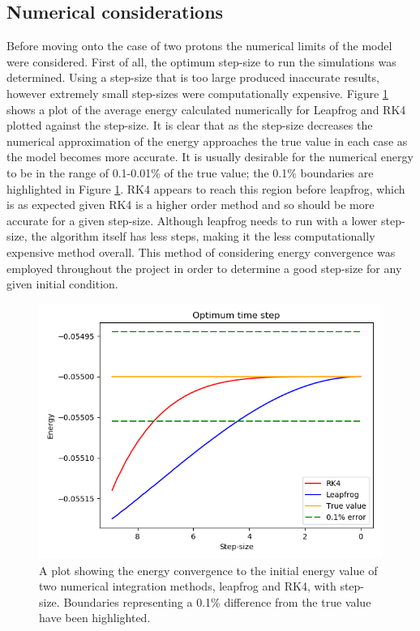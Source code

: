 \documentclass[12pt]{article} %
\numberwithin{equation}{subsection} %
\begin{document}
\subsection{Numerical considerations} \label{subsec: numerical considerations}
Before moving onto the case of two protons the numerical limits of the model were considered. First of all, the optimum step-size to run the simulations was determined. Using a step-size that is too large produced inaccurate results, however extremely small step-sizes were computationally expensive. Figure \ref{fig: optimal step size} shows a plot of the average energy calculated numerically for Leapfrog and RK4 plotted against the step-size. It is clear that as the step-size decreases the numerical approximation of the energy approaches the true value in each case as the model becomes more accurate. It is usually desirable for the numerical energy to be in the range of 0.1-0.01\% of the true value; the 0.1\% boundaries are highlighted in Figure \ref{fig: optimal step size}. RK4 appears to reach this region before leapfrog, which is as expected given RK4 is a higher order method and so should be more accurate for a given step-size. Although leapfrog needs to run with a lower step-size, the algorithm itself has less steps, making it the less computationally expensive method overall. This method of considering energy convergence was employed throughout the project in order to determine a good step-size for any given initial condition. \par
\begin{figure}[h]
    \centering
    \captionsetup{justification=centering}
	\includegraphics[scale=0.45]{images/optimalStepSize4.png}
	\caption{A plot showing the energy convergence to the initial energy value of two numerical integration methods, leapfrog and RK4, with step-size. Boundaries representing a 0.1\% difference from the true value have been highlighted.}
	\label{fig: optimal step size}
	\end{figure}
\end{document}
